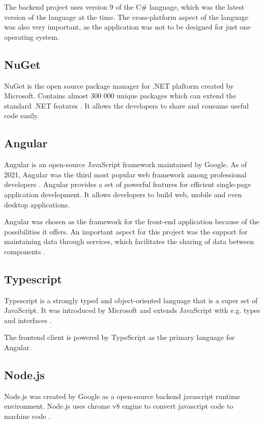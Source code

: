 \documentclass[a4paper,twoside,12pt]{book}
\begin{document}
The backend project uses version 9 of the C\# language, which was the latest version of the language at the time. The cross-platform aspect of the language was also very important, as the application was not to be designed for just one operating system. 

\subsection{NuGet}
NuGet is the open source package manager for .NET plaftorm created by Microsoft. Contains almost 300 000 unique packages which can extend the standard .NET features \cite{bib:nuget}. It allows the developers to share and consume useful code easily.

\subsection{Angular}
Angular is an open-source JavaScript framework maintained by Google. As of 2021, Angular was the third most popular web framework among professional developers \cite{bib:stackSurvey}. Angular provides a set of powerful features for efficient single-page application development. It allows developers to build web, mobile and even desktop applications.

Angular was chosen as the framework for the front-end application because of the possibilities it offers. An important aspect for this project was the support for maintaining data through services, which facilitates the sharing of data between components \cite{bib:angularServices}.

\subsection{Typescript}
Typescript is a strongly typed and object-oriented language that is a super set of JavaScript. It was introduced by Microsoft and extends JavaScript with e.g. types and interfaces \cite{bib:typescript}.

The frontend client is powered by TypeScript as the primary language for Angular.

\subsection{Node.js}
Node.js was created by Google as a open-source backend javascript runtime environment. Node.js uses chrome v8 engine to convert javascript code to machine code \cite{bib:nodeJs}.
\end{document}
